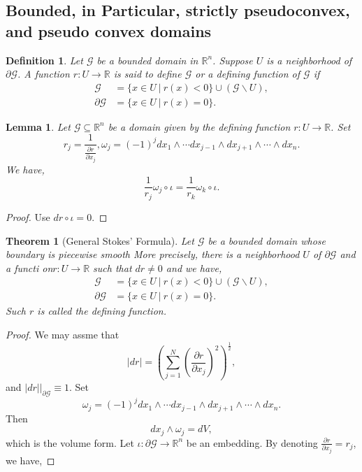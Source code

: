 \documentclass{article}
\newtheorem{theorem}{Theorem} [section]
\newtheorem{definition}{Definition}[section]
\newtheorem{lemma}{Lemma}[section]
\newcommand{\R}[0]{\mathbb{R}}
\newcommand{\G}[0]{\mathcal{G}}
\newcommand{\sep}[0]{\:|\:}
\newcommand{\pd}[2]{{\frac {\partial#1} {\partial#2}}}
\newcommand{\bd}[0]{\partial}
\begin{document}
  \subsection{Bounded, in Particular, strictly pseudoconvex, and pseudo convex domains}
  \begin{definition}
    Let $\G$ be a bounded domain in $\R^n$. Suppose $U$ is a neighborhood of $\bd\G$. A function $r:U\to\R$ is said to define $\G$ or a defining function of $\G$ if  
    \begin{align*}
      \G&=\{x\in U\sep r(x)<0\}\cup(\G\backslash U),\\
      \bd\G &= \{x\in U\sep r(x)=0\}.
    \end{align*}
  \end{definition}
    \begin{lemma}
      Let $\G\subseteq\R^n$ be a domain given by the defining function $r:U\to\R$. Set 
      \begin{equation*}
        r_j = {\frac 1 {\pd{r}{x_j}}}, \omega_j = (-1)^j dx_1\wedge\cdots dx_{j-1}\wedge dx_{j+1}\wedge\cdots\wedge dx_n.
      \end{equation*}
      We have,
    \begin{equation*}
      {\frac 1 {r_j}}\omega_j\circ \iota = {\frac 1 {r_k}}\omega_k\circ \iota.
    \end{equation*}
    \label{lemma_surface_element_uniqueness}
  \end{lemma}
  \begin{proof}
    Use $dr\circ\iota = 0$. 
  \end{proof}
  \begin{theorem}[General Stokes' Formula]
    Let $\G$ be a bounded domain whose boundary is piecewise smooth 
    More precisely, there is a neighborhood $U$ of $\bd \G$ and a functi on$r:U\to \R$ such that $dr\not=0$ and we have,
    \begin{align*}
      \G&=\{x\in U\sep r(x)<0\}\cup(\G\backslash U),\\
      \bd\G &= \{x\in U\sep r(x)=0\}.
    \end{align*}
    Such $r$ is called the defining function.
  \end{theorem}
  \setcounter{claim}{0}
  \begin{proof}
    We may assme that 
    \begin{equation*}
      \vert dr\vert=\left(\sum_{j=1}^N\left(\pd{r}{x_j}\right)^2\right)^{{\frac 1 2}},
    \end{equation*}
    and $\vert dr\vert|_{\bd\G}\equiv 1$. Set 
    \begin{equation*}
      \omega_j = (-1)^j dx_1\wedge\cdots dx_{j-1}\wedge dx_{j+1}\wedge\cdots\wedge dx_n.
    \end{equation*}
    Then 
  \begin{equation*}
    dx_j\wedge\omega_j = dV,
  \end{equation*}
  which is the volume form. Let $\iota:\bd\G\to\R^n$ be an embedding. By denoting $\pd{r}{x_j}=r_j$, we have,
  \end{proof} 
\end{document}
